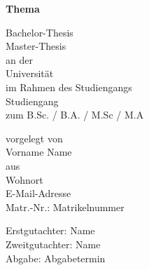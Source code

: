 \begin{center}
    \vspace*{3cm}
    \textbf{Thema}
    
    \vspace{3cm}

    Bachelor-Thesis\\
    Master-Thesis\\
    an der\\
    Universität\\
    im Rahmen des Studiengangs\\
    Studiengang\\
    zum B.Sc. / B.A. / M.Sc / M.A

    vorgelegt von\\
    Vorname Name\\
    aus\\
    Wohnort\\
    E-Mail-Adresse\\

    Matr.-Nr.: Matrikelnummer

    \vfill
    Erstgutachter: Name\\
    Zweitgutachter: Name\\
    
    Abgabe: Abgabetermin
    
\end{center}


\thispagestyle{empty}
\cleardoublepage